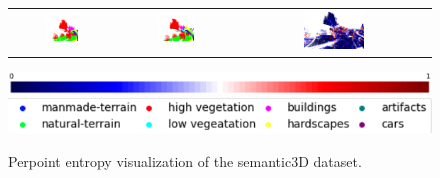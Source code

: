 \begin{figure}[h!]
\begin{tabular}{ccc}
            \includegraphics[width=0.33\textwidth, height=0.18\textheight]{images/seg_output/sem3d_seg_output/3_GT.png} &
            \includegraphics[width=0.33\textwidth, height=0.18\textheight]{images/seg_output/sem3d_seg_output/3_Pred.png}& 
            \includegraphics[width=0.33\textwidth, height=0.18\textheight]{images/seg_output/sem3d_seg_output/3_Entropy.png}\\
        \end{tabular}
        \includegraphics[scale=0.213]{images/color_legend.pdf}
        \includegraphics[scale=0.65]{images/legend.png}
        \caption{Perpoint entropy visualization of the semantic3D dataset.}
    \end{figure}

